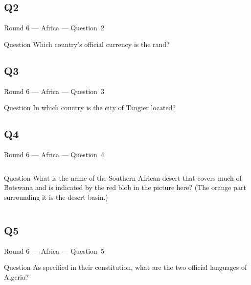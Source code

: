\documentclass[11pt]{beamer}
\begin{document}
\subsection*{Q2}
\begin{frame}[t]{Round 6 --- Africa --- \mbox{Question 2}}
\vspace{-0.5em}
\begin{block}{Question}
Which country's official currency is the rand?
\end{block}
\end{frame}
\subsection*{Q3}
\begin{frame}[t]{Round 6 --- Africa --- \mbox{Question 3}}
\vspace{-0.5em}
\begin{block}{Question}
In which country is the city of Tangier located?
\end{block}
\end{frame}
\subsection*{Q4}
\begin{frame}[t]{Round 6 --- Africa --- \mbox{Question 4}}
\vspace{-0.5em}
\begin{columns}[T,totalwidth=\linewidth]
\begin{column}{0.32\linewidth}
\begin{block}{Question}
What is the name of the Southern African desert that covers much of Botswana and is indicated by the red blob in the picture here? (The orange part surrounding it is the desert basin.)
\end{block}
\end{column}
\begin{column}{0.65\linewidth}
\begin{center}
\texttt{[image: \{Images/kalahari]}.png}
\end{center}
\end{column}
\end{columns}
\end{frame}
\subsection*{Q5}
\begin{frame}[t]{Round 6 --- Africa --- \mbox{Question 5}}
\vspace{-0.5em}
\begin{block}{Question}
As specified in their constitution, what are the two official languages of Algeria?
\end{block}
\end{frame}
\end{document}

